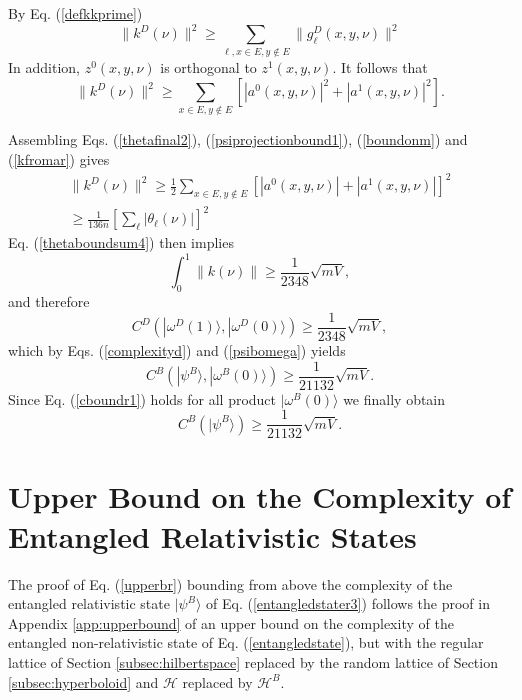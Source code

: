 \documentclass[12pt,amsmath,amssymb,onecolumn]{revtex4-2}
\begin{document}
By Eq. (\ref{defkkprime}) 
\begin{equation}
\label{kfroma0r}
\parallel k^D(\nu) \parallel ^ 2  \ge  \sum_{\ell, x \in E, y \notin E} \parallel g^D_\ell( x, y, \nu) \parallel^2
\end{equation}
In addition, $z^0(x,y,\nu)$ is orthogonal
to $z^1(x, y, \nu)$. It follows that
\begin{equation}
\label{kfromar}
\parallel k^D(\nu) \parallel^2 \ge \sum_{x \in E, y \notin E} [|a^0(x,y,\nu)|^2 + |a^1(x,y,\nu)|^2].
\end{equation}

Assembling Eqs. (\ref{thetafinal2}), (\ref{psiprojectionbound1}), (\ref{boundonm})
and (\ref{kfromar}) gives
\begin{multline}
\label{kboundr}
\parallel k^D(\nu) \parallel^2 \ge \frac{1}{2} \sum_{x \in E, y \notin E} [|a^0(x,y,\nu)| + |a^1(x,y,\nu)|]^2 \\
\ge \frac{1}{136 n} [\sum_{\ell} |\theta_{\ell}(\nu)|] ^ 2
\end{multline}
Eq. (\ref{thetaboundsum4}) then implies
\begin{equation}
\label{kbound1r}
\int_0^1 \parallel k(\nu) \parallel \ge \frac{1}{2348} \sqrt{mV},
\end{equation}
and therefore
\begin{equation}
\label{cboundr}
C^D( |\omega^D(1) \rangle , |\omega^D(0) \rangle ) \ge \frac{1}{2348}\sqrt{ mV},
\end{equation}
which by Eqs. (\ref{complexityd}) and (\ref{psibomega}) yields
\begin{equation}
\label{cboundr1}
C^B( |\psi^B \rangle , |\omega^B(0) \rangle ) \ge \frac{1}{21132}\sqrt{ mV}.
\end{equation}
Since Eq. (\ref{cboundr1}) holds for all product $|\omega^B(0) \rangle $
we finally obtain
\begin{equation}
\label{cbound2r}
C^B( |\psi^B \rangle ) \ge \frac{1}{21132} \sqrt{ mV}.
\end{equation}




\section{\label{app:upperboundr} Upper Bound on the Complexity of Entangled Relativistic States}

The proof of Eq. (\ref{upperbr}) bounding from above the
complexity of the entangled relativistic state $|\psi^B \rangle $ of Eq. (\ref{entangledstater3}) 
follows the proof in Appendix \ref{app:upperbound} of an upper bound
on the complexity of the entangled non-relativistic state of Eq. (\ref{entangledstate}),
but with the regular lattice of Section \ref{subsec:hilbertspace} replaced by
the random lattice of Section \ref{subsec:hyperboloid} and
$\mathcal{H}$ replaced by $\mathcal{H}^B$.
\end{document}
